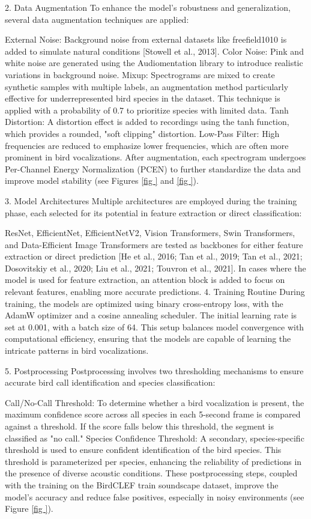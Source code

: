 2. Data Augmentation
To enhance the model’s robustness and generalization, several data augmentation techniques are applied:

External Noise: Background noise from external datasets like freefield1010 is added to simulate natural conditions [Stowell et al., 2013].
Color Noise: Pink and white noise are generated using the Audiomentation library to introduce realistic variations in background noise.
Mixup: Spectrograms are mixed to create synthetic samples with multiple labels, an augmentation method particularly effective for underrepresented bird species in the dataset. This technique is applied with a probability of 0.7 to prioritize species with limited data.
Tanh Distortion: A distortion effect is added to recordings using the tanh function, which provides a rounded, "soft clipping" distortion.
Low-Pass Filter: High frequencies are reduced to emphasize lower frequencies, which are often more prominent in bird vocalizations.
After augmentation, each spectrogram undergoes Per-Channel Energy Normalization (PCEN) to further standardize the data and improve model stability (see Figures \ref{fig
} and \ref{fig
}).

3. Model Architectures
Multiple architectures are employed during the training phase, each selected for its potential in feature extraction or direct classification:

ResNet, EfficientNet, EfficientNetV2, Vision Transformers, Swin Transformers, and Data-Efficient Image Transformers are tested as backbones for either feature extraction or direct prediction [He et al., 2016; Tan et al., 2019; Tan et al., 2021; Dosovitskiy et al., 2020; Liu et al., 2021; Touvron et al., 2021]. In cases where the model is used for feature extraction, an attention block is added to focus on relevant features, enabling more accurate predictions.
4. Training Routine
During training, the models are optimized using binary cross-entropy loss, with the AdamW optimizer and a cosine annealing scheduler. The initial learning rate is set at 0.001, with a batch size of 64. This setup balances model convergence with computational efficiency, ensuring that the models are capable of learning the intricate patterns in bird vocalizations.

5. Postprocessing
Postprocessing involves two thresholding mechanisms to ensure accurate bird call identification and species classification:

Call/No-Call Threshold: To determine whether a bird vocalization is present, the maximum confidence score across all species in each 5-second frame is compared against a threshold. If the score falls below this threshold, the segment is classified as "no call."
Species Confidence Threshold: A secondary, species-specific threshold is used to ensure confident identification of the bird species. This threshold is parameterized per species, enhancing the reliability of predictions in the presence of diverse acoustic conditions.
These postprocessing steps, coupled with the training on the BirdCLEF train soundscape dataset, improve the model's accuracy and reduce false positives, especially in noisy environments (see Figure \ref{fig
}).
